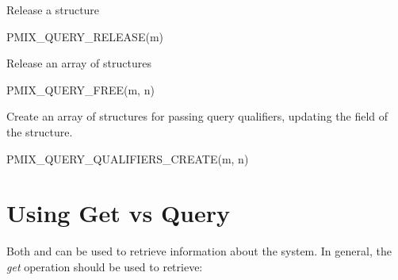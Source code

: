 
Release a  structure

\cspecificstart
\begin{codepar}
PMIX_QUERY_RELEASE(m)
\end{codepar}
\cspecificend

\begin{arglist}
\end{arglist}


Release an array of  structures

\cspecificstart
\begin{codepar}
PMIX_QUERY_FREE(m, n)
\end{codepar}
\cspecificend

\begin{arglist}
\end{arglist}


Create an array of  structures for passing query qualifiers, updating the  field of the  structure.

\cspecificstart
\begin{codepar}
PMIX_QUERY_QUALIFIERS_CREATE(m, n)
\end{codepar}
\cspecificend

\begin{arglist}
\end{arglist}


\section{Using Get vs Query}
\label{chap:api_job_mgmt:query}

Both  and  can be used to retrieve information about the system. In general, the \emph{get} operation should be used to retrieve:

